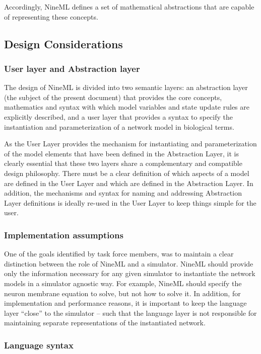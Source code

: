 \documentclass[a4paper]{article}
\begin{document}
Accordingly, NineML defines a set of mathematical abstractions that
are capable of representing these concepts.

\subsection{Design Considerations}


\subsubsection{User layer and Abstraction layer}

The design of NineML is divided into two semantic layers: an abstraction
layer (the subject of the present document) that provides the core
concepts, mathematics and syntax with which model variables and state
update rules are explicitly described, and a user layer that provides a
syntax to specify the instantiation and parameterization of a network
model in biological terms.

As the User Layer provides the mechanism for instantiating and
parameterization of the model elements that have been defined in the
Abstraction Layer, it is clearly essential that these two layers share
a complementary and compatible design philosophy. There must be a
clear definition of which aspects of a model are defined in the User
Layer and which are defined in the Abstraction Layer. In addition, the
mechanisms and syntax for naming and addressing Abstraction Layer definitions
is ideally re-used in the User Layer to keep things simple for the user.

\subsubsection{Implementation assumptions}

One of the goals identified by task force members, was to maintain a
clear distinction between the role of NineML and a simulator. NineML
should provide only the information necessary for any given simulator
to instantiate the network models in a simulator agnostic way.  For
example, NineML should specify the neuron membrane equation to solve,
but not how to solve it.  In addition, for implementation and
performance reasons, it is important to keep the language layer
“close” to the simulator – such that the language layer is not
responsible for maintaining separate representations of the
instantiated network.

\subsubsection{Language syntax}
\end{document}

